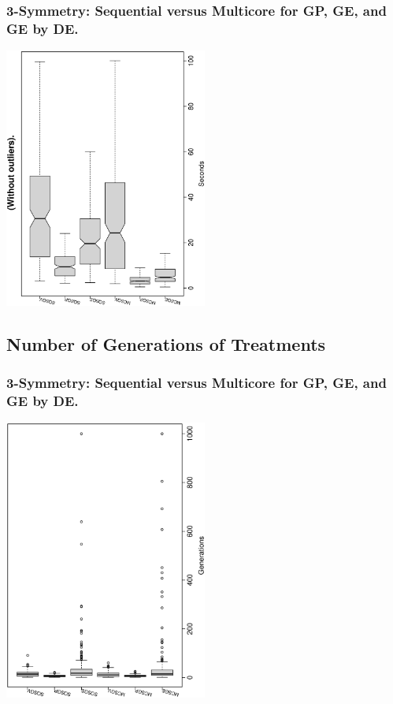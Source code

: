 \documentclass[18pt,c]{beamer}
\makeatletter
\let\beamer@writeslidentry@miniframeson=\beamer@writeslidentry
\newcommand*{\miniframeson}{\let\beamer@writeslidentry=\beamer@writeslidentry@miniframeson}
\makeatother
\begin{document}
 \begin{frame}
 \frametitle{ 3-Symmetry: Sequential versus Multicore for GP, GE, and GE by DE.  }
 \begin{center}
\includegraphics[width=0.5\textwidth, angle=-90]
{ExpAboxplottSeconds001.eps}
 \end{center}
 \label{ExpAboxplottSeconds001.eps}  
 \end{frame}

\miniframeson
\subsection{Number of Generations of Treatments}
 \begin{frame}
 \frametitle{ 3-Symmetry: Sequential versus Multicore for GP, GE, and GE by DE.  }
 \begin{center}
\includegraphics[width=0.5\textwidth, angle=-90]
{ExpAboxplottGenerations000.eps}
 \end{center}
 \label{ExpAboxplottGenerations000.eps}  
 \end{frame}
\end{document}
